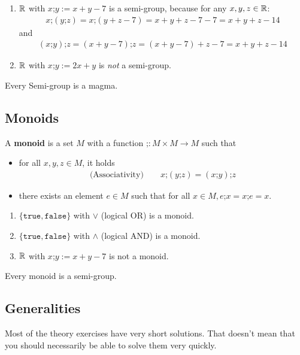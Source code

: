 \begin{enumerate}
  \item $\mathbb{R}$ with $x\texttt{;}y := x + y - 7$ is a semi-group, because for any $x,y,z \in \mathbb{R}$:
    \begin{align*}
      x \texttt{;} (y \texttt{;}z)
      =
      x \texttt{;} (y + z - 7)
      =
      x + y + z - 7 - 7
      = x + y + z - 14
    \end{align*}
    and
    \begin{align*}
      (x \texttt{;} y) \texttt{;}z
      =
      (x + y - 7) \texttt{;}z
      =
      (x + y - 7) + z - 7
      = x + y + z - 14
    \end{align*}
  \item $\mathbb{R}$ with $x \texttt{;}y := 2x + y$ is \emph{not} a semi-group.
\end{enumerate}
Every Semi-group is a magma.

\subsection{Monoids}
A \textbf{monoid} is a set $M$ with a function $\texttt{;}: M \times M \to M$ such that 
\begin{itemize}
  \item for all $x,y,z \in M$, it holds
    \begin{align*}
      \text{(Associativity)} \qquad
      x \texttt{;} (y \texttt{;}z) = (x \texttt{;}y) \texttt{;}z
    \end{align*}
  \item there exists an element $e \in M$ such that for all $x \in M, e \texttt{;}x = x \texttt{;}e = x$.
\end{itemize}

\begin{enumerate}
  \item $\{\texttt{true},\texttt{false}\}$ with $\lor$ (logical OR) is a monoid.
  \item $\{\texttt{true},\texttt{false}\}$ with $\land$ (logical AND) is a monoid.
  \item $\mathbb{R}$ with $x \texttt{;}y := x + y - 7$ is not a monoid.
\end{enumerate}
Every monoid is a semi-group.



\subsection{Generalities}

Most of the theory exercises have very short solutions. That doesn't mean that you should necessarily be able to solve them very quickly.


